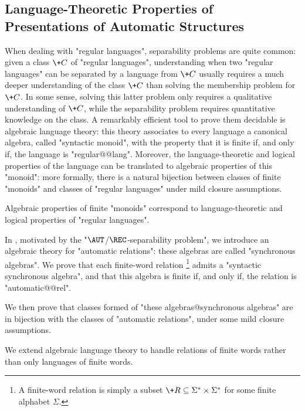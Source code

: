 \subsection{Language-Theoretic Properties of Presentations of Automatic Structures}

When dealing with "regular languages",
separability problems are quite common:
given a class $\+C$ of "regular languages", understanding
when two "regular languages" can be separated by a language from $\+C$
usually requires a much deeper understanding of the class $\+C$ than
solving the membership problem for $\+C$. In some sense, solving
this latter problem only requires a qualitative understanding of $\+C$,
while the separability problem requires quantitative knowledge on the class. 
A remarkably efficient tool
to prove them decidable is algebraic language theory:
this theory associates to every language a canonical algebra, called "syntactic monoid",
with the property that it is finite if, and only if, the language is "regular@@lang".
Moreover, the language-theoretic and logical properties of the language can be
translated to algebraic properties of this "monoid": more formally, there is a natural
bijection between classes of finite "monoids" and classes of
"regular languages" under mild closure assumptions.

\begin{known}
	Algebraic properties of finite "monoids" correspond to
	language-theoretic and logical properties of "regular languages".
\end{known}

In , motivated by the "$\AUT$/$\REC$-separability problem",
we introduce an algebraic theory for "automatic relations": these algebras are called
"synchronous algebras".
We prove that each finite-word relation%
\footnote{A finite-word relation is simply a subset
$\+R \subseteq \Sigma^* \times \Sigma^*$ for some finite alphabet $\Sigma$.}
admits a "syntactic synchronous algebra",
and that this algebra is finite if, and only if, the relation is "automatic@@rel".

We then prove that classes formed of "these algebras@synchronous algebras" 
are in bijection with the classes of "automatic relations", under some mild closure
assumptions. 

\begin{contribution}
	We extend algebraic language theory to handle relations of finite words
	rather than only languages of finite words.
\end{contribution}

